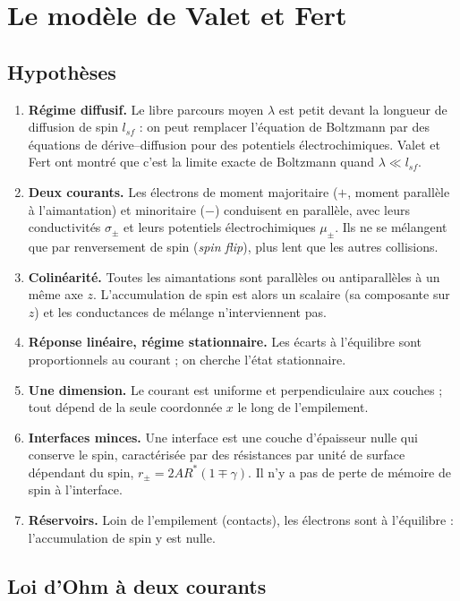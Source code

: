 \documentclass[11pt,a4paper]{article}
\begin{document}
\section{Le modèle de Valet et Fert}

\subsection{Hypothèses}

\begin{enumerate}
  \item \textbf{Régime diffusif.} Le libre parcours moyen $\lambda$ est
    petit devant la longueur de diffusion de spin $l_{sf}$ : on peut
    remplacer l'équation de Boltzmann par des équations de dérive--diffusion
    pour des potentiels électrochimiques. Valet et Fert ont montré que
    c'est la limite exacte de Boltzmann quand $\lambda\ll l_{sf}$.
  \item \textbf{Deux courants.} Les électrons de moment majoritaire ($+$,
    moment parallèle à l'aimantation) et minoritaire ($-$) conduisent en
    parallèle, avec leurs conductivités $\sigma_\pm$ et leurs potentiels
    électrochimiques $\mu_\pm$. Ils ne se mélangent que par renversement de
    spin (\emph{spin flip}), plus lent que les autres collisions.
  \item \textbf{Colinéarité.} Toutes les aimantations sont parallèles ou
    antiparallèles à un même axe $z$. L'accumulation de spin est alors un
    scalaire (sa composante sur $z$) et les conductances de mélange
    n'interviennent pas.
  \item \textbf{Réponse linéaire, régime stationnaire.} Les écarts à
    l'équilibre sont proportionnels au courant ; on cherche l'état
    stationnaire.
  \item \textbf{Une dimension.} Le courant est uniforme et perpendiculaire
    aux couches ; tout dépend de la seule coordonnée $x$ le long de
    l'empilement.
  \item \textbf{Interfaces minces.} Une interface est une couche d'épaisseur
    nulle qui conserve le spin, caractérisée par des résistances par unité
    de surface dépendant du spin, $r_\pm = 2AR^*(1\mp\gamma)$. Il n'y a pas
    de perte de mémoire de spin à l'interface.
  \item \textbf{Réservoirs.} Loin de l'empilement (contacts), les électrons
    sont à l'équilibre : l'accumulation de spin y est nulle.
\end{enumerate}

\subsection{Loi d'Ohm à deux courants}
\end{document}
